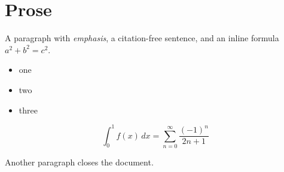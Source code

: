 \documentclass{article}
\begin{document}
\section{Prose}
A paragraph with \emph{emphasis}, a citation-free sentence, and an inline formula $a^2+b^2=c^2$.

\begin{itemize}
\item one \item two \item three
\end{itemize}

\begin{equation}
\int_0^1 f(x)\,dx = \sum_{n=0}^{\infty} \frac{(-1)^n}{2n+1}
\end{equation}

Another paragraph closes the document.
\end{document}
